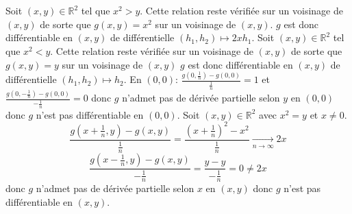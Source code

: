 \documentclass{report}
\begin{document}
\subsection{} \noindent{}\\ 
\\ 
\\
\noindent Soit $(x,y)\in \mathbb R^2$ tel que $x^2>y$. Cette relation reste vérifiée sur un voisinage de $(x,y)$ de sorte que $g(x,y)=x^2$ sur un voisinage de $(x,y)$. $g$ est donc différentiable en $(x,y)$ de différentielle $(h_1,h_2)\mapsto 2xh_1$.\newline \newline
Soit $(x,y)\in \mathbb R^2$ tel que $x^2<y$. Cette relation reste vérifiée sur un voisinage de $(x,y)$ de sorte que $g(x,y)=y$ sur un voisinage de $(x,y)$
$g$ est donc différentiable en $(x,y)$ de différentielle $(h_1,h_2)\mapsto h_2$.\newline \newline
En $(0,0)$: $\displaystyle \frac{g(0,\frac 1n) - g(0,0)}{\frac 1n} = 1$ et $\displaystyle \frac{g(0,-\frac 1n) - g(0,0)}{-\frac 1n}=0$ donc $g$ n'admet pas de dérivée partielle selon $y$ en $(0,0)$ donc $g$ n'est pas différentiable en $(0,0)$. \newline \newline
Soit $(x,y)\in \mathbb R^2$ avec $x^2=y$ et $x\neq 0$. $$\displaystyle \frac{g(x+\frac 1n,y) - g(x,y)}{\frac 1n} = \frac{\left(x+\frac 1n \right)^2-x^2}{\frac 1n}\xrightarrow[n\to \infty]{} 2x$$
$$\displaystyle \frac{g(x-\frac 1n,y) - g(x,y)}{-\frac 1n} = \frac{y-y}{-\frac 1n}=0\neq 2x$$
donc $g$ n'admet pas de dérivée partielle selon $x$ en $(x,y)$ donc $g$ n'est pas différentiable en $(x,y)$.
\end{document}

